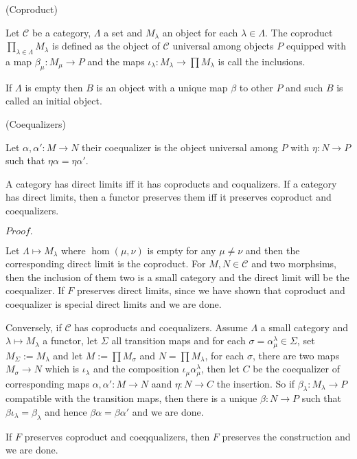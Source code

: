 \documentclass{article}
\newcommand{\Pf}[1]{$Proof.$\par}
\begin{document}
    \begin{definition}
        (Coproduct)\par
        Let $\mathcal{C}$ be a category, $\Lambda$ a set and $M_{\lambda}$ an object for each $\lambda\in\Lambda$. The coproduct $\prod_{\lambda\in\Lambda} M_{\lambda}$ is defined as the object of $\mathcal{C}$ universal among objects $P$ equipped with a map $\beta_{\mu}:M_{\mu} \to P$ and the maps $\iota_{\lambda}: M_{\lambda} \to \prod M_{\lambda}$ is call the inclusions.\par
        If $\Lambda$ is empty then $B$ is an object with a unique map $\beta$ to other $P$ and such $B$ is called an initial object.
    \end{definition}

    \begin{definition}
        (Coequalizers)\par
        Let $\alpha,\alpha':M \to N$ their coequalizer is the object universal among $P$ with $\eta: N\to P$ such that $\eta\alpha = \eta\alpha'$.
    \end{definition}

    \begin{lemma}
        A category has direct limits iff it has coproducts and coqualizers. If a category has direct limits, then a functor preserves them iff it preserves coproduct and coequalizers.
    \end{lemma}
    \Pf\par
        Let $\Lambda \mapsto M_{\lambda}$ where $\hom(\mu,\nu)$ is empty for any $\mu \neq \nu$ and then the corresponding direct limit is the coproduct. For $M,N\in\mathcal{C}$ and two morphsims, then the inclusion of them two is a small category and the direct limit will be the coequalizer. If $F$ preserves direct limits, since we have shown that coproduct and coequalizer is special direct limits and we are done.\par
        Conversely, if $\mathcal{C}$ has coproducts and coequalizers. Assume $\Lambda$ a small category and $\lambda \mapsto M_{\lambda}$ a functor, let $\Sigma$ all transition maps and for each  $\sigma = \alpha^{\lambda}_{\mu} \in \Sigma$, set $M_{\Sigma} := M_{\lambda}$ and let $M:= \prod M_{\sigma}$ and $N = \prod M_{\lambda}$, for each $\sigma$, there are two maps $M_{\sigma} \to N$ which is $\iota_{\lambda}$ and the composition $\iota_{\mu}\alpha_{\mu}^{\lambda}$, then let $C$ be the coequalizer of corresponding maps $\alpha,\alpha':M\to N$ aand $\eta: N \to C$ the insertion. So if $\beta_{\lambda}: M_{\lambda} \to P$ compatible with the transition maps, then there is a unique $\beta: N \to P$  such that $\beta\iota_{\lambda} = \beta_{\lambda}$ and hence $\beta\alpha = \beta\alpha'$ and we are done.\par
        If $F$ preserves coproduct and coeqqualizers, then $F$ preserves the construction and we are done.
\end{document}
